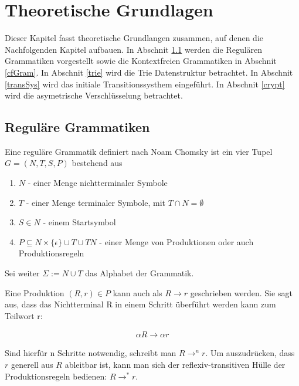 \documentclass[a4paper,12pt]{report}
\begin{document}
\chapter{Theoretische Grundlagen}
\label{theo}


Dieser Kapitel fasst theoretische Grundlangen zusammen, auf denen die Nachfolgenden Kapitel aufbauen. In Abschnit \ref{regGram} werden die Regulären Grammatiken vorgestellt sowie die Kontextfreien Grammatiken in Abschnit \ref{cfGram}. In Abschnit \ref{trie} wird die Trie Datenstruktur betrachtet. In Abschnit \ref{transSys} wird das initiale Transitionssysthem eingeführt. In Abschnit \ref{crypt} wird die asymetrische Verschlüsselung betrachtet.

\section{Reguläre Grammatiken}
\label{regGram}
Eine reguläre Grammatik definiert nach Noam Chomsky ist ein vier Tupel 
$G = (N,T,S,P)$ bestehend aus 

\begin{enumerate}
\item $N$ - einer Menge nichtterminaler Symbole 
\item $T$ - einer Menge terminaler Symbole, mit $T\cap N = \emptyset$
\item $S\in N$ - einem Startsymbol
\item $P \subseteq N\times \{\epsilon\}\cup T \cup TN$ - einer Menge von Produktionen oder auch Produktionsregeln
\end{enumerate}

Sei weiter $\Sigma := N \cup T$ das Alphabet der Grammatik.

Eine Produktion $(R,r)\in P$ kann auch als $R\rightarrow r$ geschrieben werden.
Sie sagt aus, dass das Nichtterminal R in einem Schritt überführt werden kann zum Teilwort r:

\begin{eqnarray}
  \alpha R \rightarrow \alpha r
\end{eqnarray}

Sind hierfür n Schritte notwendig, schreibt man $R \rightarrow^n r$. Um auszudrücken, dass $r$ generell aus $R$ ableitbar ist, kann man sich der reflexiv-transitiven Hülle der Produktionsregeln bedienen: $R \rightarrow ^* r$.
\end{document}
